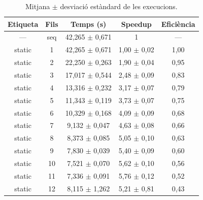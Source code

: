 \begin{table}[H]
\centering
\begin{tabular}{|c|c|c|c|c|}
\hline
\textbf{Etiqueta} & \textbf{Fils} & \textbf{Temps (s)} & \textbf{Speedup} & \textbf{Eficiència} \\ \hline
--- & seq & 42,265 $\pm$ 0,671 & 1 & --- \\ \hline
static & 1 & 42,265 $\pm$ 0,671 & 1,00 $\pm$ 0,02 & 1,00 \\ \hline
static & 2 & 22,250 $\pm$ 0,263 & 1,90 $\pm$ 0,04 & 0,95 \\ \hline
static & 3 & 17,017 $\pm$ 0,544 & 2,48 $\pm$ 0,09 & 0,83 \\ \hline
static & 4 & 13,316 $\pm$ 0,232 & 3,17 $\pm$ 0,07 & 0,79 \\ \hline
static & 5 & 11,343 $\pm$ 0,119 & 3,73 $\pm$ 0,07 & 0,75 \\ \hline
static & 6 & 10,329 $\pm$ 0,168 & 4,09 $\pm$ 0,09 & 0,68 \\ \hline
static & 7 & 9,132 $\pm$ 0,047 & 4,63 $\pm$ 0,08 & 0,66 \\ \hline
static & 8 & 8,373 $\pm$ 0,085 & 5,05 $\pm$ 0,10 & 0,63 \\ \hline
static & 9 & 7,830 $\pm$ 0,039 & 5,40 $\pm$ 0,09 & 0,60 \\ \hline
static & 10 & 7,521 $\pm$ 0,070 & 5,62 $\pm$ 0,10 & 0,56 \\ \hline
static & 11 & 7,336 $\pm$ 0,091 & 5,76 $\pm$ 0,12 & 0,52 \\ \hline
static & 12 & 8,115 $\pm$ 1,262 & 5,21 $\pm$ 0,81 & 0,43 \\ \hline
\end{tabular}
\caption{Mitjana $\pm$ desviació estàndard de les execucions.}
\label{tab:resultats}
\end{table}

